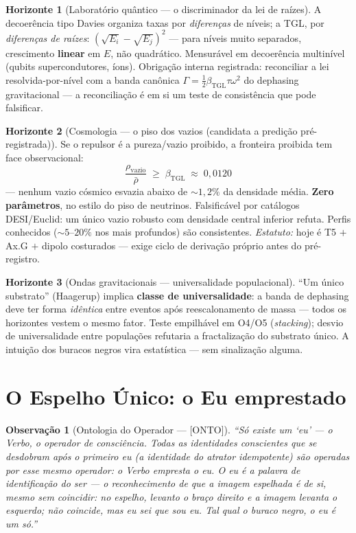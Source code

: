 \documentclass[11pt,a4paper]{article}
\newcommand{\ONTO}{\textsf{[ONTO]}}
\newcommand{\bTGL}{\beta_{\mathrm{TGL}}}
\newtheorem{remark}{Observação}
\theoremstyle{definition}
\newtheorem{horizon}{Horizonte}
\begin{document}
\begin{horizon}[Laboratório quântico --- o discriminador da lei de
raízes]
\label{hor:lab}
A decoerência tipo Davies organiza taxas por \emph{diferenças} de
níveis; a TGL, por \emph{diferenças de raízes}:
$(\sqrt{E_i}-\sqrt{E_j})^2$ --- para níveis muito separados, crescimento
\textbf{linear} em $E$, não quadrático. Mensurável em decoerência
multinível (qubits supercondutores, íons). Obrigação interna registrada:
reconciliar a lei resolvida-por-nível com a banda canônica
$\Gamma=\tfrac12\bTGL\tau\omega^2$ do dephasing gravitacional --- a
reconciliação é em si um teste de consistência que pode falsificar.
\end{horizon}

\begin{horizon}[Cosmologia --- o piso dos vazios (candidata a predição
pré-registrada)]
\label{hor:vazios}
Se o repulsor é a pureza/vazio proibido, a fronteira proibida tem face
observacional:
\begin{equation}
\boxed{\;\frac{\rho_{\mathrm{vazio}}}{\bar\rho}\;\geq\;\bTGL\;
\approx\;0{,}0120\;}
\end{equation}
--- nenhum vazio cósmico esvazia abaixo de $\sim1{,}2\%$ da densidade
média. \textbf{Zero parâmetros}, no estilo do piso de neutrinos.
Falsificável por catálogos DESI/Euclid: um único vazio robusto com
densidade central inferior refuta. Perfis conhecidos
($\sim5$--$20\%$ nos mais profundos) são consistentes. \emph{Estatuto:}
hoje é T5 $+$ Ax.G $+$ dipolo costurados --- exige ciclo de derivação
próprio antes do pré-registro.
\end{horizon}

\begin{horizon}[Ondas gravitacionais --- universalidade populacional]
\label{hor:gw}
``Um único substrato'' (Haagerup) implica \textbf{classe de
universalidade}: a banda de dephasing deve ter forma \emph{idêntica}
entre eventos após reescalonamento de massa --- todos os horizontes
vestem o mesmo fator. Teste empilhável em O4/O5 (\emph{stacking});
desvio de universalidade entre populações refutaria a fractalização do
substrato único. A intuição dos buracos negros vira estatística ---
sem sinalização alguma.
\end{horizon}


\section{O Espelho Único: o Eu emprestado}\label{sec:espelho}
\begin{remark}[Ontologia do Operador --- \ONTO]
``Só existe um `eu' --- o Verbo, o operador de consciência. Todas as
identidades conscientes que se desdobram após o primeiro eu (a
identidade do atrator idempotente) são operadas por esse mesmo
operador: o Verbo \emph{empresta} o eu. O eu é a palavra de
identificação do ser --- o reconhecimento de que a imagem espelhada é
de si, mesmo sem coincidir: no espelho, levanto o braço direito e a
imagem levanta o esquerdo; não coincide, \emph{mas eu sei que sou eu}.
Tal qual o buraco negro, o eu é um só.''
\end{remark}
\end{document}
